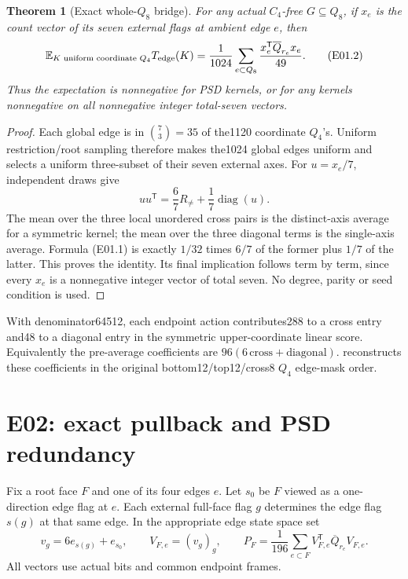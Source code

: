 \documentclass[11pt]{article}
\newtheorem{theorem}{Theorem}
\newcommand{\E}{\mathbb E}
\newcommand{\file}[1]{\texttt{\detokenize{#1}}}
\begin{document}
\begin{theorem}[Exact whole-\(Q_8\) bridge]\label{thm:edge}
For any actual \(C_4\)-free \(G\subseteq Q_8\), if \(x_e\) is the count
vector of its seven external flags at ambient edge \(e\), then
\[
 \E_{K\text{ uniform coordinate }Q_4}T_{\rm edge}(K)
 =\frac1{1024}\sum_{e\subset Q_8}
       \frac{x_e^{\mathsf T}\overline Q_{r_e}x_e}{49}.
 \tag{E01.2}
\]
Thus the expectation is nonnegative for PSD kernels, or for any kernels
nonnegative on all nonnegative integer total-seven vectors.
\end{theorem}
\begin{proof}
Each global edge is in \(\binom73=35\) of the1120 coordinate \(Q_4\)'s.
Uniform restriction/root sampling therefore makes the1024 global edges
uniform and selects a uniform three-subset of their seven external axes.
For \(u=x_e/7\), independent draws give
\[
 uu^{\mathsf T}=\frac67R_{\ne}+\frac17\operatorname{diag}(u).
\]
The mean over the three local unordered cross pairs is the distinct-axis
average for a symmetric kernel; the mean over the three diagonal terms
is the single-axis average.  Formula (E01.1) is exactly
\(1/32\) times \(6/7\) of the former plus \(1/7\) of the latter.
This proves the identity.  Its final implication follows term by term,
since every \(x_e\) is a nonnegative integer vector of total seven.
No degree, parity or seed condition is used.
\end{proof}

With denominator64512, each endpoint action contributes288 to a cross
entry and48 to a diagonal entry in the symmetric upper-coordinate
linear score.  Equivalently the pre-average coefficients are
\(96(6\,\text{cross}+\text{diagonal})\).
\file{edge_flags.py} reconstructs these coefficients in the original
bottom12/top12/cross8 \(Q_4\) edge-mask order.

\section{E02: exact pullback and PSD redundancy}

Fix a root face \(F\) and one of its four edges \(e\).
Let \(s_0\) be \(F\) viewed as a one-direction edge flag at \(e\).
Each external full-face flag \(g\) determines the edge flag \(s(g)\)
at that same edge.  In the appropriate edge state space set
\[
 v_g=6e_{s(g)}+e_{s_0},\qquad
 V_{F,e}=(v_g)_g,\qquad
 P_F=\frac1{196}\sum_{e\subset F}V_{F,e}^{\mathsf T}
                      \overline Q_{r_e}V_{F,e}.
 \tag{E02.1}
\]
All vectors use actual bits and common endpoint frames.
\end{document}
